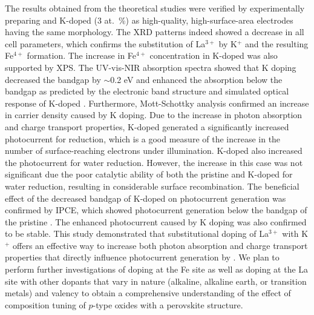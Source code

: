 The results obtained from the theoretical studies were verified by experimentally preparing  and K-doped (3 at.\ \%)  as high-quality, high-surface-area electrodes having the same morphology. The XRD patterns indeed showed a decrease in all cell parameters, which confirms the substitution of La$^{3+}$ by K$^+$ and the resulting Fe$^{4+}$ formation. The increase in Fe$^{4+}$ concentration in K-doped  was also supported by XPS. The UV-vis-NIR absorption spectra showed that K doping decreased the bandgap by $\sim$0.2 eV and enhanced the absorption below the bandgap as predicted by the electronic band structure and simulated optical response of K-doped . Furthermore, Mott-Schottky analysis confirmed an increase in carrier density caused by K doping. Due to the increase in photon absorption and charge transport properties, K-doped  generated a significantly increased photocurrent for  reduction, which is a good measure of the increase in the number of surface-reaching electrons under illumination. K-doped  also increased the photocurrent for water reduction. However, the increase in this case was not significant due the poor catalytic ability of both the pristine and K-doped  for water reduction, resulting in considerable surface recombination. The beneficial effect of the decreased bandgap of K-doped  on photocurrent generation was confirmed by IPCE, which showed photocurrent generation below the bandgap of the pristine . The enhanced photocurrent caused by K doping was also confirmed to be stable. This study demonstrated that substitutional doping of La$^{3+}$ with K$^+$ offers an effective way to increase both photon absorption and charge transport properties that directly influence photocurrent generation by . We plan to perform further investigations of doping at the Fe site as well as doping at the La site with other dopants that vary in nature (alkaline, alkaline earth, or transition metals) and valency to obtain a comprehensive understanding of the effect of composition tuning of $p$-type oxides with a perovskite structure.



